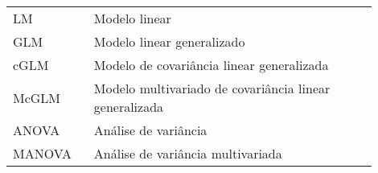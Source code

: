 

\begin{listaacron}

\begin{longtable}[l]{p{0.2\linewidth}p{0.7\linewidth}}

LM & Modelo linear\\
GLM & Modelo linear generalizado\\
cGLM & Modelo de covariância linear generalizada\\
McGLM & Modelo multivariado de covariância linear generalizada\\
ANOVA & Análise de variância\\
MANOVA & Análise de variância multivariada\\

\end{longtable}

\end{listaacron}

